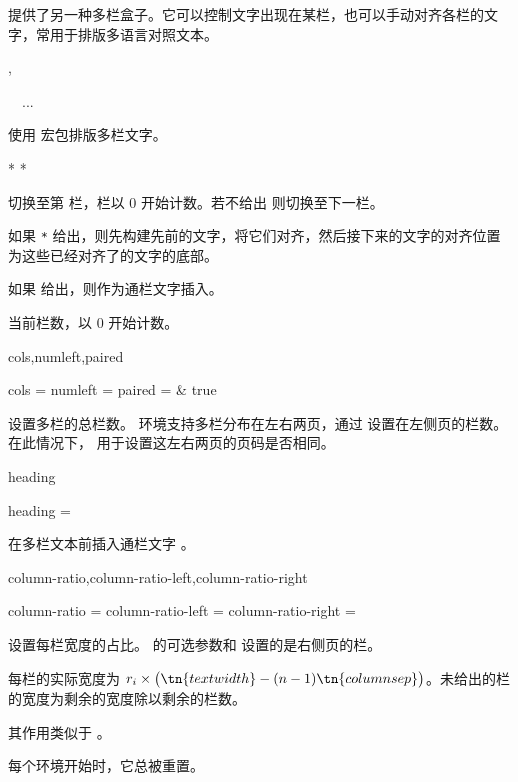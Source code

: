 \documentclass{cusdoc}
\begin{document}
 提供了另一种多栏盒子。它可以控制文字出现在某栏，也可以手动对齐各栏的文字，常用于排版多语言对照文本。

\begin{function}{\startparacol,\stopparacol}
  \begin{syntax}
    \V\startparacol {}
    ~~...
    \V\stopparacol 
  \end{syntax}
使用  宏包排版多栏文字。
\end{function}

\begin{function}[module=paracol]{\switchcolumn}
  \begin{syntax}
    \V\switchcolumn 
    \V\switchcolumn *
    \V\switchcolumn {}
    \V\switchcolumn {} * 
    \V\switchcolumn {} * 
  \end{syntax}
切换至第  栏，栏以 0 开始计数。若不给出  则切换至下一栏。

如果 \texttt{*} 给出，则先构建先前的文字，将它们对齐，然后接下来的文字的对齐位置为这些已经对齐了的文字的底部。

如果  给出，则作为通栏文字插入。
\end{function}

\begin{function}[module=paracol]{\thecolumn}
当前栏数，以 0 开始计数。
\end{function}

\begin{keyval}[path=paracol]{cols,numleft,paired}
  \begin{syntax}
    cols    = 
    numleft = 
    paired  = \TTF & true 
  \end{syntax}
 设置多栏的总栏数。 环境支持多栏分布在左右两页，通过  设置在左侧页的栏数。在此情况下， 用于设置这左右两页的页码是否相同。
\end{keyval}

\begin{keyval}[path=paracol]{heading}
  \begin{syntax}
    heading = 
  \end{syntax}
在多栏文本前插入通栏文字 。
\end{keyval}

\begin{keyval}[path=paracol]{column-ratio,column-ratio-left,column-ratio-right}
  \begin{syntax}
    column-ratio       =  
    column-ratio-left  = 
    column-ratio-right = 
  \end{syntax}
设置每栏宽度的占比。 的可选参数和  设置的是右侧页的栏。

每栏的实际宽度为 $r_i\times\bigl(\tn{textwidth}-(n-1)\tn{columnsep}\bigr)$。未给出的栏的宽度为剩余的宽度除以剩余的栏数。

其作用类似于 。

每个环境开始时，它总被重置。
\end{keyval}
\end{document}
